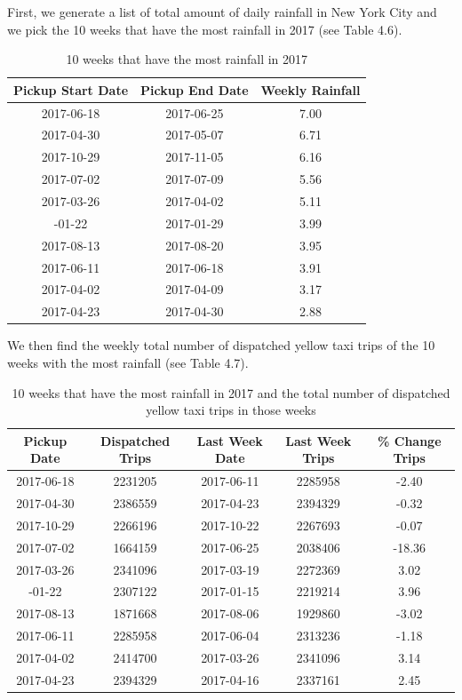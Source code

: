 \documentclass[12pt,twoside]{reedthesis}
\theoremstyle{definition}
\theoremstyle{definition}
\theoremstyle{definition}
\theoremstyle{remark}
\begin{document}
First, we generate a list of total amount of daily rainfall in New York
City and we pick the 10 weeks that have the most rainfall in 2017 (see
Table 4.6).
\begin{table}

\caption{\label{tab:unnamed-chunk-76}10 weeks that have the most rainfall in 2017}
\centering
\begin{tabular}[t]{ccc}
\toprule
Pickup Start Date & Pickup End Date & Weekly Rainfall\\
\midrule
2017-06-18 & 2017-06-25 & 7.00\\
2017-04-30 & 2017-05-07 & 6.71\\
2017-10-29 & 2017-11-05 & 6.16\\
2017-07-02 & 2017-07-09 & 5.56\\
2017-03-26 & 2017-04-02 & 5.11\\
\addlinespace
2017-01-22 & 2017-01-29 & 3.99\\
2017-08-13 & 2017-08-20 & 3.95\\
2017-06-11 & 2017-06-18 & 3.91\\
2017-04-02 & 2017-04-09 & 3.17\\
2017-04-23 & 2017-04-30 & 2.88\\
\bottomrule
\end{tabular}
\end{table}
We then find the weekly total number of dispatched yellow taxi trips of
the 10 weeks with the most rainfall (see Table 4.7).
\begin{table}

\caption{\label{tab:unnamed-chunk-78}10 weeks that have the most rainfall in 2017 and the total number of dispatched yellow taxi trips in those weeks}
\centering
\begin{tabular}[t]{ccccc}
\toprule
Pickup Date & Dispatched Trips & Last Week Date & Last Week Trips & \% Change Trips\\
\midrule
2017-06-18 & 2231205 & 2017-06-11 & 2285958 & -2.40\\
2017-04-30 & 2386559 & 2017-04-23 & 2394329 & -0.32\\
2017-10-29 & 2266196 & 2017-10-22 & 2267693 & -0.07\\
2017-07-02 & 1664159 & 2017-06-25 & 2038406 & -18.36\\
2017-03-26 & 2341096 & 2017-03-19 & 2272369 & 3.02\\
\addlinespace
2017-01-22 & 2307122 & 2017-01-15 & 2219214 & 3.96\\
2017-08-13 & 1871668 & 2017-08-06 & 1929860 & -3.02\\
2017-06-11 & 2285958 & 2017-06-04 & 2313236 & -1.18\\
2017-04-02 & 2414700 & 2017-03-26 & 2341096 & 3.14\\
2017-04-23 & 2394329 & 2017-04-16 & 2337161 & 2.45\\
\bottomrule
\end{tabular}
\end{table}
\end{document}
